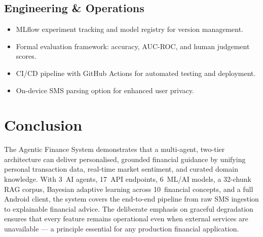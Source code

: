 \documentclass[12pt,a4paper]{article}
\begin{document}
\subsection{Engineering \& Operations}
\begin{itemize}[leftmargin=1.5em]
  \item MLflow experiment tracking and model registry for version management.
  \item Formal evaluation framework: accuracy, AUC-ROC, and human judgement scores.
  \item CI/CD pipeline with GitHub Actions for automated testing and deployment.
  \item On-device SMS parsing option for enhanced user privacy.
\end{itemize}

\section{Conclusion}

The Agentic Finance System demonstrates that a multi-agent, two-tier architecture can deliver personalised, grounded financial guidance by unifying personal transaction data, real-time market sentiment, and curated domain knowledge. With 3~AI agents, 17~API endpoints, 6~ML/AI models, a 32-chunk RAG corpus, Bayesian adaptive learning across 10~financial concepts, and a full Android client, the system covers the end-to-end pipeline from raw SMS ingestion to explainable financial advice. The deliberate emphasis on graceful degradation ensures that every feature remains operational even when external services are unavailable --- a principle essential for any production financial application.
\end{document}
